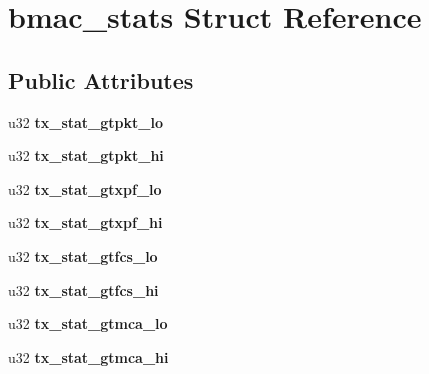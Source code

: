 \hypertarget{structbmac__stats}{
\section{bmac\_\-stats Struct Reference}
\label{structbmac__stats}
}
\subsection*{Public Attributes}
\begin{DoxyCompactItemize}
\item 
\hypertarget{structbmac__stats_ac10e9fc057567bec6da1836d73c5b2dd}{
u32 {\bfseries tx\_\-stat\_\-gtpkt\_\-lo}}
\label{structbmac__stats_ac10e9fc057567bec6da1836d73c5b2dd}

\item 
\hypertarget{structbmac__stats_a3666746d7d98edc2fa8425c078c91f6a}{
u32 {\bfseries tx\_\-stat\_\-gtpkt\_\-hi}}
\label{structbmac__stats_a3666746d7d98edc2fa8425c078c91f6a}

\item 
\hypertarget{structbmac__stats_a5dd6d28154e053c726e2dc49c9169a93}{
u32 {\bfseries tx\_\-stat\_\-gtxpf\_\-lo}}
\label{structbmac__stats_a5dd6d28154e053c726e2dc49c9169a93}

\item 
\hypertarget{structbmac__stats_aa1ec44bfeb2da90dbb2e39b429331066}{
u32 {\bfseries tx\_\-stat\_\-gtxpf\_\-hi}}
\label{structbmac__stats_aa1ec44bfeb2da90dbb2e39b429331066}

\item 
\hypertarget{structbmac__stats_af4a248fc175f3ea2c60299541d756631}{
u32 {\bfseries tx\_\-stat\_\-gtfcs\_\-lo}}
\label{structbmac__stats_af4a248fc175f3ea2c60299541d756631}

\item 
\hypertarget{structbmac__stats_ac379b700e5c243b06b156f84d24cd7c3}{
u32 {\bfseries tx\_\-stat\_\-gtfcs\_\-hi}}
\label{structbmac__stats_ac379b700e5c243b06b156f84d24cd7c3}

\item 
\hypertarget{structbmac__stats_aeb26906be9703a172796ae170206b578}{
u32 {\bfseries tx\_\-stat\_\-gtmca\_\-lo}}
\label{structbmac__stats_aeb26906be9703a172796ae170206b578}

\item 
\hypertarget{structbmac__stats_ab34f19de9c3c1b694e3136854d0927f3}{
u32 {\bfseries tx\_\-stat\_\-gtmca\_\-hi}}
\label{structbmac__stats_ab34f19de9c3c1b694e3136854d0927f3}


\end{DoxyCompactItemize}
